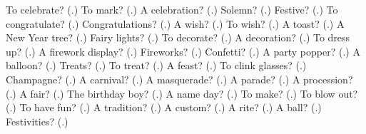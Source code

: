 \begin{tcolorbox}[breakable,colback=teal!4,colframe=teal!35!black,title={Before you move on}]
To celebrate? (\textbf{}.) To mark? (\textbf{}.) A celebration? (\textbf{}.) Solemn? (\textbf{}.) Festive? (\textbf{}.) To congratulate? (\textbf{}.) Congratulations? (\textbf{}.) A wish? (\textbf{}.) To wish? (\textbf{}.) A toast? (\textbf{}.) A New Year tree? (\textbf{}.) Fairy lights? (\textbf{}.) To decorate? (\textbf{}.) A decoration? (\textbf{}.) To dress up? (\textbf{}.) A firework display? (\textbf{}.) Fireworks? (\textbf{}.) Confetti? (\textbf{}.) A party popper? (\textbf{}.) A balloon? (\textbf{}.) Treats? (\textbf{}.) To treat? (\textbf{}.) A feast? (\textbf{}.) To clink glasses? (\textbf{}.) Champagne? (\textbf{}.) A carnival? (\textbf{}.) A masquerade? (\textbf{}.) A parade? (\textbf{}.) A procession? (\textbf{}.) A fair? (\textbf{}.) The birthday boy? (\textbf{}.) A name day? (\textbf{}.) To make? (\textbf{}.) To blow out? (\textbf{}.) To have fun? (\textbf{}.) A tradition? (\textbf{}.) A custom? (\textbf{}.) A rite? (\textbf{}.) A ball? (\textbf{}.) Festivities? (\textbf{}.)
\end{tcolorbox}
